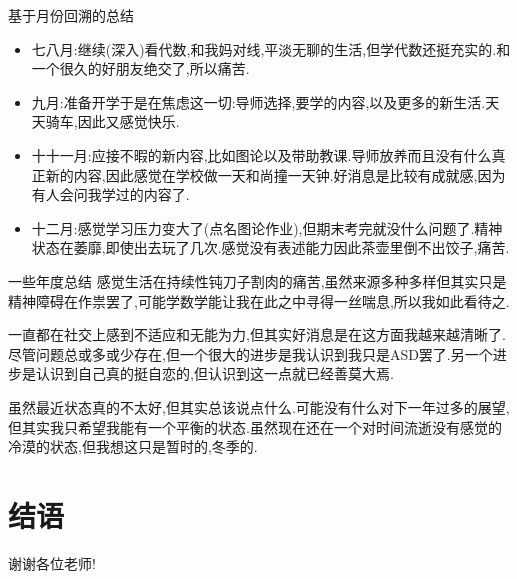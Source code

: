 \documentclass{beamer}
\begin{document}
\begin{frame}{基于月份回溯的总结}
\begin{itemize}
    \item 七八月:继续(深入)看代数,和我妈对线,平淡无聊的生活,但学代数还挺充实的.和一个很久的好朋友绝交了,所以痛苦.
    \item 九月:准备开学于是在焦虑这一切:导师选择,要学的内容,以及更多的新生活.天天骑车,因此又感觉快乐.
    \item 十十一月:应接不暇的新内容,比如图论以及带助教课.导师放养而且没有什么真正新的内容,因此感觉在学校做一天和尚撞一天钟.好消息是比较有成就感,因为有人会问我学过的内容了.
    \item 十二月:感觉学习压力变大了(点名图论作业),但期末考完就没什么问题了.精神状态在萎靡,即使出去玩了几次.感觉没有表述能力因此茶壶里倒不出饺子,痛苦.
\end{itemize}
\end{frame}

\begin{frame}{一些年度总结}
    感觉生活在持续性钝刀子割肉的痛苦,虽然来源多种多样但其实只是精神障碍在作祟罢了,可能学数学能让我在此之中寻得一丝喘息,所以我如此看待之.\vspace{1em}
    
    一直都在社交上感到不适应和无能为力,但其实好消息是在这方面我越来越清晰了.尽管问题总或多或少存在,但一个很大的进步是我认识到我只是ASD罢了.另一个进步是认识到自己真的挺自恋的,但认识到这一点就已经善莫大焉.\vspace{1em}

    虽然最近状态真的不太好,但其实总该说点什么.可能没有什么对下一年过多的展望,但其实我只希望我能有一个平衡的状态.虽然现在还在一个对时间流逝没有感觉的冷漠的状态,但我想这只是暂时的,冬季的.
\end{frame}

\section{结语}
\begin{frame}
    \begin{center}
        \Huge 谢谢各位老师!
    \end{center}
\end{frame}
\end{document}
